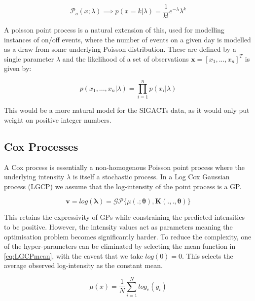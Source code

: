 \documentclass[a4paper,11pt]{report}
\begin{document}
\begin{equation}\label{eq:poisson}
\mathcal{P}_o (x;\lambda) \implies p(x=k|\lambda) =  \frac{1}{k!} e^{-\lambda} \lambda^k
\end{equation}

A poisson point process is a natural extension of this, used for modelling instances of on/off events, where the number of events on a given day is modelled as a draw from some underlying Poisson distribution. \cite{Gregory} These are defined by a single parameter \(\lambda\) and the likelihood of a set of observations \(\mathbf{x}=[x_1,...,x_n]^T\) is given by:

\begin{equation}
p(x_1,...,x_n|\lambda) = \prod_{i=1}^{n} p(x_i|\lambda)
\end{equation}

This would be a more natural model for the SIGACTs data, as it would only put weight on positive integer numbers. 


\subsection{Cox Processes}
A Cox process is essentially a non-homogenous Poisson point process where the underlying intensity \(\lambda\) is itself a stochastic process. In a Log Cox Gaussian process (LGCP) we assume that the log-intensity of the point process is a GP. 

\begin{equation} \label{eq:LGCPsetup}
\mathbf{v} = log(\boldsymbol{\lambda}) = \mathcal{G}\mathcal{P} \{ \mu(. ;\boldsymbol{\theta}) , \mathbf{K}(. , . ,\boldsymbol{\theta})\}
\end{equation}

This retains the expressivity of GPs while constraining the predicted intensities to be positive. However, the intensity values act as parameters meaning the optimisation problem becomes significantly harder. To reduce the complexity, one of the hyper-parameters can be eliminated by selecting the mean function in \ref{eq:LGCPmean}, with the caveat that we take \(log(0)=0\). This selects the average observed log-intensity as the constant mean. 

\begin{equation} \label{eq:LGCPmean}
\mu (x) = \frac{1}{N} \sum_{i=1}^{N} log_e(y_i)
\end{equation}
\end{document}
